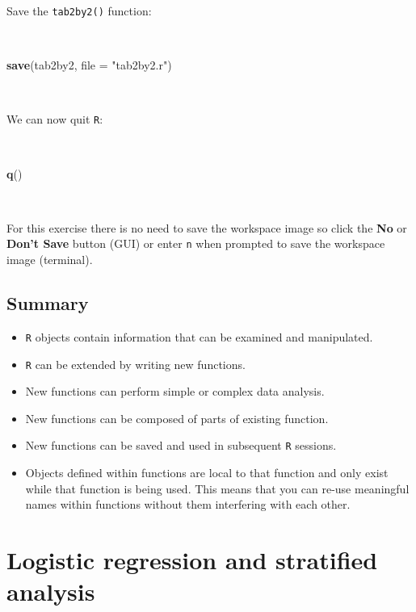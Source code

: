 \documentclass[12pt,a4paper]{book}
\newenvironment{Shaded}{\begin{snugshade}}{\end{snugshade}}
\newcommand{\DataTypeTok}[1]{\textcolor[rgb]{0.13,0.29,0.53}{#1}}
\newcommand{\KeywordTok}[1]{\textcolor[rgb]{0.13,0.29,0.53}{\textbf{#1}}}
\newcommand{\NormalTok}[1]{#1}
\newcommand{\StringTok}[1]{\textcolor[rgb]{0.31,0.60,0.02}{#1}}
\theoremstyle{definition}
\theoremstyle{definition}
\theoremstyle{definition}
\theoremstyle{remark}
\begin{document}
Save the \texttt{tab2by2()} function:

~

\begin{Shaded}
\begin{Highlighting}[]
\KeywordTok{save}\NormalTok{(tab2by2, }\DataTypeTok{file =} \StringTok{"tab2by2.r"}\NormalTok{)}
\end{Highlighting}
\end{Shaded}

~

We can now quit \texttt{R}:

~

\begin{Shaded}
\begin{Highlighting}[]
\KeywordTok{q}\NormalTok{()}
\end{Highlighting}
\end{Shaded}

~

For this exercise there is no need to save the workspace image so click
the \textbf{No} or \textbf{Don't Save} button (GUI) or enter \texttt{n}
when prompted to save the workspace image (terminal).

\hypertarget{summary-1}{%
\section{Summary}\label{summary-1}}

\begin{itemize}
\item
  \texttt{R} objects contain information that can be examined and
  manipulated.
\item
  \texttt{R} can be extended by writing new functions.
\item
  New functions can perform simple or complex data analysis.
\item
  New functions can be composed of parts of existing function.
\item
  New functions can be saved and used in subsequent \texttt{R} sessions.
\item
  Objects defined within functions are local to that function and only
  exist while that function is being used. This means that you can
  re-use meaningful names within functions without them interfering with
  each other.
\end{itemize}

\hypertarget{exercise3}{%
\chapter{Logistic regression and stratified analysis}\label{exercise3}}
\end{document}
